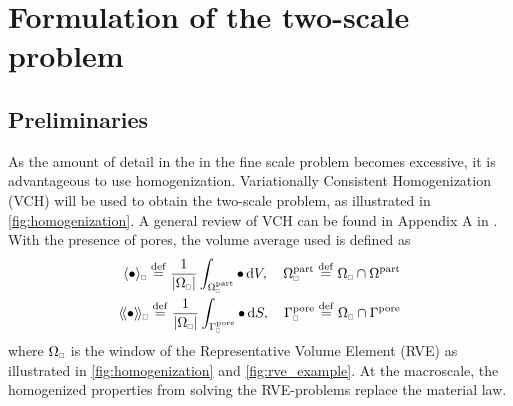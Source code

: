 \documentclass[MikaelDissertation.tex]{subfiles}
\begin{document}

\chapter{Formulation of the two-scale problem}

\section{Preliminaries}

As the amount of detail in the in the fine scale problem becomes excessive, it is advantageous to use homogenization.
Variationally Consistent Homogenization (VCH) will be used to obtain the two-scale problem, as illustrated in \cref{fig:homogenization}.
A general review of VCH can be found in Appendix A in .
With the presence of pores, the volume average used is defined as
\begin{align}
 \homgen{\bullet} \defeq \frac{1}{\volume} \int_{\Omega_\rve^\particle} \bullet \dif V,\quad \Omega_\rve^\particle \defeq \Omega_\rve \cap \Omega^\particle
\\
 \shomgen{\bullet} \defeq \frac{1}{\volume} \int_{\Gamma^\pore_\rve} \bullet \dif S,\quad \Gamma^\pore_\rve \defeq \Omega_\rve \cap \Gamma^\pore
\end{align}
where $\Omega_\rve$ is the window of the Representative Volume Element (RVE) as illustrated in \cref{fig:homogenization} and \cref{fig:rve_example}.
At the macroscale, the homogenized properties from solving the RVE-problems replace the material law.
\end{document}
